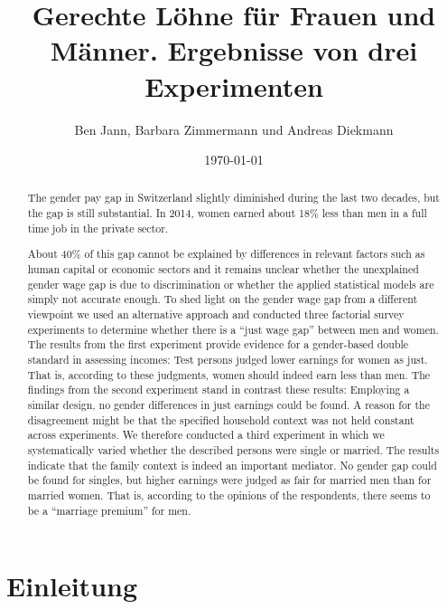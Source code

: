 \documentclass[a4paper,12pt]{article}
\renewcommand{\baselinestretch}{1.1}
\newif\ifcomments
\newcommand{\comment}[1]{%
    \ifcomments\marginpar{\renewcommand{\baselinestretch}{1}\tiny\hspace*{-1.1em}\colorbox{gray!20}%
    {\textcolor{red}{\parbox[t]{.9in}{\raggedright #1}}}}\fi}
\begin{document}
\title{Gerechte Löhne für Frauen und Männer. Ergebnisse von drei Experimenten}
\author{Ben Jann, Barbara Zimmermann und Andreas Diekmann}
\date{\today}
\maketitle

\tableofcontents

\newpage
\begin{abstract}
    \comment{Deutschen Abstract hinzufügen ...}
    
    The gender pay gap in Switzerland slightly diminished during the last two
    decades, but the gap is still substantial. In 2014, women earned about 18\%
    less than men in a full time job in the private sector. \comment{Zahlen aktualisieren?}
    About 40\% of this gap cannot be explained
    by differences in relevant factors such as human capital or economic
    sectors and it remains unclear whether the unexplained gender wage gap is
    due to discrimination or whether the applied statistical models are simply
    not accurate enough. To shed light on the gender wage gap from a different
    viewpoint we used an alternative approach and conducted three factorial
    survey experiments to determine whether there is a “just wage gap” between
    men and women. The results from the first experiment provide evidence for a
    gender-based double standard in assessing incomes: Test persons judged
    lower earnings for women as just. That is, according to these judgments,
    women should indeed earn less than men. The findings from the second
    experiment stand in contrast these results: Employing a similar design, no
    gender differences in just earnings could be found. A reason for the
    disagreement might be that the specified household context was not held
    constant across experiments. We therefore conducted a third experiment in
    which we systematically varied whether the described persons were single or
    married. The results indicate that the family context is indeed an
    important mediator. No gender gap could be found for singles, but higher
    earnings were judged as fair for married men than for married women. That
    is, according to the opinions of the respondents, 
    there seems to be a “marriage premium” for men.
\end{abstract}

\newpage
\section{Einleitung}
\label{sec:s1}
\end{document}
